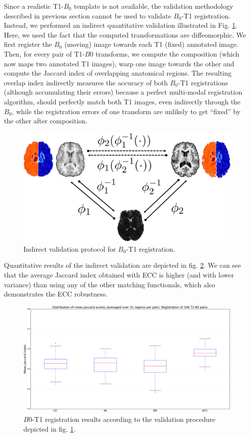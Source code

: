 Since a realistic T1-$B_{0}$ template is not available, the validation methodology described in previous section cannot be used to validate $B_{0}$-T1 registration. Instead, we performed an indirect quantitative validation illustrated in Fig. \ref{fig:indirect_validation}. Here, we used the fact that the computed transformations are diffeomorphic. We first register the $B_{0}$ (moving) image towards each T1 (fixed) annotated image. Then, for every pair of T1-$B0$ transforms, we compute the composition (which now maps two annotated T1 images), warp one image towards the other and compute the Jaccard index of overlapping anatomical regions. The resulting overlap index indirectly measures the accuracy of both $B_{0}$-T1 registrations (although accumulating their errors) because a perfect multi-modal registration algorithm, should perfectly match both T1 images, even indirectly through the $B_{0}$, while the registration errors of one transform are unlikely to get ``fixed'' by the other after composition.
\begin{figure}[H]
\centering
    \includegraphics[width=\linewidth]{./images/new_validation.png}
    \caption{{\small Indirect validation protocol for $B_{0}$-T1 registration.}}
\label{fig:indirect_validation}
\end{figure}

Quantitative results of the indirect validation are depicted in fig. \ref{fig:indirect_validation_boxplots}. We can see that the average Jaccard index obtained with ECC is higher (and with lower variance) than using any of the other matching functionals, which also demonstrates the ECC robustness.
\begin{figure}[H]
\centering
    \includegraphics[width=\linewidth]{./images/T1B0Result/jaccard_boxplots_T1_B0.png}
    \caption{{\small $B0$-T1 registration results according to the validation procedure depicted in fig. \ref{fig:indirect_validation}.}}
\label{fig:indirect_validation_boxplots}
\end{figure}
